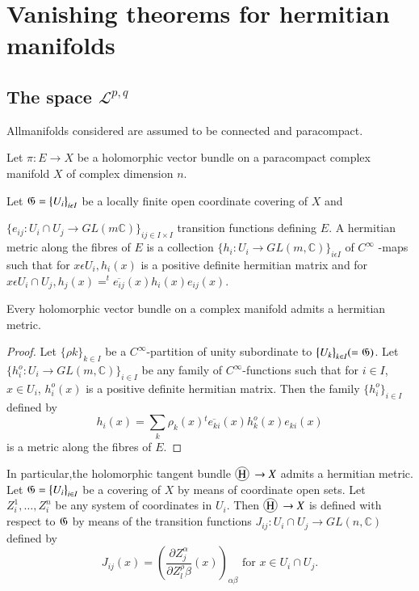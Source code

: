 \chapter{Vanishing theorems for hermitian manifolds}\label{chap1}%

\section{The space $\mathcal{L}^{p,q}$}%
 
 All\pageoriginale manifolds considered are assumed to be connected
 and  paracompact. 
 
 Let $\pi :E \rightarrow X$ be a holomorphic vector bundle on a
 paracompact  complex manifold $X$ of complex dimension $n$. 
 
 Let $\mathfrak{G}=\big\{{U_i}\big\}_{i \epsilon I}$  be a locally
 finite open coordinate covering of $X$ and  
 
 $\big\{e_{ij}:U_i \cap U _j \rightarrow GL (m\mathbb{C})
\big\}_{ij \in I \times I}$  
 transition functions defining $E$. A hermitian metric along the fibres
 of $E$ is a collection $\big\{h_i :U_i \rightarrow GL
 (m, \mathbb{C})\big\}_{i \epsilon I }$ of $C^{\infty}$
 -maps such that for $x \epsilon U_i, h_i (x)$ is a positive definite
 hermitian matrix and for $x \epsilon U _i \cap U _j, h_j (x)=
 ^{t}\overline {e_{ij}}(x) h_i (x) e_{ij}(x)$.  
 
\begin{lemma}%
  Every holomorphic vector bundle on a complex manifold  admits a
  hermitian metric.  
\end{lemma}
 
 \begin{proof}
   Let $\big\{ \rho k\big\}_{k \in I}$ be a $C^ \infty$-partition of
   unity subordinate to $\big\{U_k\big\}_{k 
     \in I} (= \mathfrak{G})$. Let $\big\{h_i^o :U_i
   \rightarrow GL (m, \mathbb{C})\big\}_{i \in I}$  be any
   family of $C^\infty$-functions such that for $i \in I$, $x \in
   U_i$, $h^o_i (x)$ is a positive definite  hermitian matrix. Then
   the family $\big\{ h^o_i \big\}_{i\in I}$ defined by 
   $$
    h_i (x) = \sum\limits_k \rho_k(x) {}^{t}
    \overline{e_{ki}}(x)h^o_k(x)e_{ki}(x) 
   $$
   is a metric along the fibres of $E$.
 \end{proof}
 
In particular,\pageoriginale the holomorphic tangent bundle
$\mycirc{H} \to X $ admits a hermitian metric. Let
$\mathfrak{G} = \big\{U_i\big\}_{i  \in I}$ be a covering of $X$ by
means of coordinate open sets. Let $Z^1_i,\ldots ,Z^n_i$  be any system of
coordinates in $U_i$. Then $\mycirc{H}\rightarrow X $ is
defined with respect to $\mathfrak{G}$ by means of the transition
functions $J_{ij} :U_i \cap U_j \rightarrow GL
(n, \mathbb{C})$ defined by  
$$ 
J_{ij}(x)= \left( \frac{\partial Z^\alpha_j}{ \partial Z^\rho_l
  \beta }(x)\right)_{\alpha \beta} \text{ for  } x \in U _i \cap
U_j. 
$$ 


